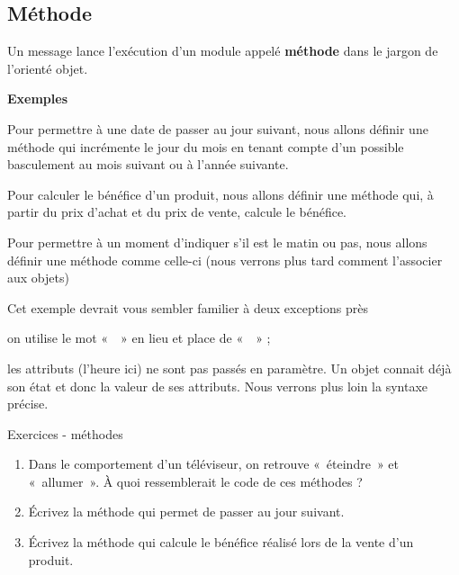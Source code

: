 	\subsection{Méthode}
	
		Un message lance l'exécution d'un
		module appelé \textbf{méthode} dans le jargon de
		l'orienté objet.

		\textbf{Exemples}
		\begin{liste}
		\item
			Pour permettre à une date de passer au jour suivant, nous allons définir
			une méthode qui incrémente le jour du mois en tenant compte
			d'un possible basculement au mois suivant ou à
			l'année suivante.
		\item
			Pour calculer le bénéfice d'un produit, nous allons définir
			une méthode qui, à partir du prix d'achat et du prix de vente,
			calcule le bénéfice.
		\item 
			Pour permettre à un moment d'indiquer
			s'il est le matin ou pas, nous allons définir une
			méthode comme celle-ci (nous verrons plus tard comment
			l'associer aux objets)
	
			\medskip
			
			\medskip
			Cet exemple devrait vous sembler familier à deux exceptions près
	
			\begin{liste}
				\item
					on utilise le mot «~~» en lieu et place de
					«~~» ;
				\item
					les attributs (l'heure ici) ne sont pas passés en
					paramètre. Un objet connait déjà son état et donc la valeur de ses
					attributs. Nous verrons plus loin la syntaxe précise.
			\end{liste}
		\end{liste}

		\begin{Emphase}{Exercices - méthodes}
			\remonter
			\begin{enumerate}
			\item 
				Dans le comportement d'un téléviseur, on retrouve
				«~éteindre~» et «~allumer~». 
				À quoi ressemblerait le code de ces méthodes ?
			\item 
				Écrivez la méthode qui permet de passer au jour suivant.
			\item 
				Écrivez la méthode qui calcule 
				le bénéfice réalisé lors de la vente d'un produit.
			\end{enumerate}
		\end{Emphase}

